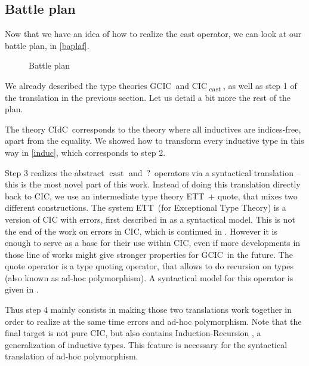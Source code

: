 \documentclass{kaobook}
\renewcommand{\mathtt}{\mathrm}
\DeclareMathOperator{\?}{?}
\newcommand{\cas}{\operatorname{\mathtt{cast}}}
\newcommand{\quo}{\mathtt{quote}}
\newcommand{\gcic}{GCIC}
\newcommand{\cacic}{CIC\textsubscript{$\cas$}}
\newcommand{\cidc}{CIdC}
\newcommand{\ett}{ETT}
\newcommand{\eqcic}{\ett\ + $\quo$}
\begin{document}
{\subsection{Battle plan}
\label{baplas}

Now that we have an idea of how to realize the cast operator, we can look at our battle plan, in \autoref{baplaf}.
\begin{figure}[h]
	\centering
	\caption{Battle plan}
	\label{baplaf}
\end{figure}

We already described the type theories \gcic\ and \cacic, as well as step 1 of the translation in the previous section. Let us detail a bit more the rest of the plan.

The theory \cidc\ corresponds to the theory where all inductives are indices-free, apart from the equality. We showed how to transform every inductive type in this way in \autoref{induc}, which corresponds to step 2.

Step 3 realizes the abstract $\cas$ and $\?$ operators via a syntactical translation – this is the most novel part of this work. Instead of doing this translation directly back to CIC, we use an intermediate type theory \eqcic, that mixes two different constructions. The system \ett\ (for Exceptional Type Theory) is a version of CIC with errors, first described in \cite{Pedrot2018} as a syntactical model. This is not the end of the work on errors in CIC, which is continued in \cite{Pedrot2019}. However it is enough to serve as a base for their use within CIC, even if more developments in those line of works might give stronger properties for \gcic\ in the future. The $\quo$ operator is a type quoting operator, that allows to do recursion on types (also known as ad-hoc polymorphism). A syntactical model for this operator is given in \cite{Boulier2017}.

Thus step 4 mainly consists in making those two translations work together in order to realize at the same time errors and ad-hoc polymorphism. Note that the final target is not pure CIC, but also contains Induction-Recursion \cite{Dybjer2000}, a generalization of inductive types. This feature is necessary for the syntactical translation of ad-hoc polymorphism.

}
\end{document}
